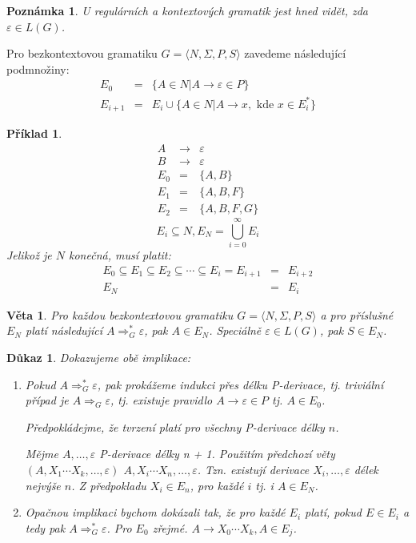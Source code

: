 \documentclass[10pt, a4paper, titlepage]{article}
\theoremstyle{note}
\newtheorem{veta}{Věta}
\newtheorem{dukaz}{Důkaz}
\newtheorem{priklad}{Příklad}
\newtheorem{poznamka}{Poznámka}
\begin{document}
\begin{poznamka}
U regulárních a kontextových gramatik jest hned vidět, zda $\varepsilon \in L(G)$.
\end{poznamka}

Pro bezkontextovou gramatiku $G = \langle N, \Sigma, P,S \rangle$ zavedeme následující podmnožiny:
\begin{eqnarray*}
E_{0} &=& \lbrace A \in N | A \rightarrow \varepsilon \in P \rbrace \\
E_{i+1} &=& E_{i} \cup \lbrace A \in N | A \rightarrow x, \text{ kde } x \in E_{i}^* \rbrace
\end{eqnarray*}

\begin{priklad}
\begin{eqnarray*}
A &\rightarrow& \varepsilon \\
B &\rightarrow& \varepsilon \\
E_{0} &=& \lbrace A, B \rbrace \\
E_{1} &=& \lbrace A, B, F \rbrace \\
E_{2} &=& \lbrace A, B, F, G \rbrace
\end{eqnarray*}
$$
E_{i} \subseteq N, E_{N} = \bigcup_{i=0}^{\infty} E_{i}
$$
Jelikož je $N$ konečná, musí platit:
\begin{eqnarray*}
E_{0} \subseteq E_{1} \subseteq E_{2} \subseteq \cdots \subseteq E_{i} = E_{i+1} &=& E_{i+2} \\
E_{N} &=& E_{i}
\end{eqnarray*}
\end{priklad}

\begin{veta}
Pro každou bezkontextovou gramatiku $G = \langle N, \Sigma, P,S \rangle$ a pro příslušné $E_{N}$ platí následující $A \Rightarrow_{G}^{*}\varepsilon$, pak $A \in E_{N}$. 
Speciálně $\varepsilon \in L(G)$, pak $S \in E_{N}$.
\end{veta}

\begin{dukaz}
Dokazujeme obě implikace:
\begin{enumerate}
\item
Pokud $A \Rightarrow_{G}^{*}\varepsilon$, pak prokážeme indukci přes délku P-derivace, tj. triviální případ je $A \Rightarrow_{G}\varepsilon$, 
tj. existuje pravidlo $A \rightarrow \varepsilon \in P$ tj. $A \in E_{0}$.

Předpokládejme, že tvrzení platí pro všechny P-derivace délky $n$.

Mějme $A, \ldots, \varepsilon$ P-derivace délky n + 1. Použitím předchozí věty $(A, X_{1} \cdots X_{k}, \ldots, \varepsilon)$ $A, X_{i} \cdots X_{n}, \ldots, \varepsilon$.
Tzn. existují derivace $X_{i}, \ldots, \varepsilon$ délek nejvýše $n$. Z předpokladu $X_{i} \in E_{n}$, pro každé $i$ tj. i $A \in E_{N}$. 

\item
Opačnou implikaci bychom dokázali tak, že pro každé $E_{i}$ platí, pokud $E \in E_{i}$ a tedy pak $A \Rightarrow_{G}^{*}\varepsilon$. Pro $E_{0}$ zřejmé.
$A \rightarrow X_{0} \cdots X_{k}, A \in E_{j}$.
\end{enumerate}
\end{dukaz}
\end{document}
